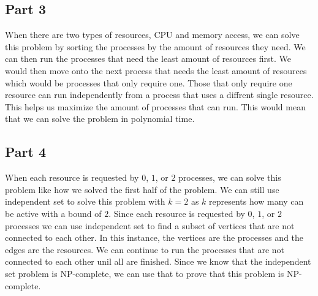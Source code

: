 \documentclass[12pt,letterpaper]{article}
\begin{document}
\subsection{Part 3}

When there are two types of resources, CPU and memory access, we can solve this problem by sorting the processes by the amount of resources they need. We can then run the processes that need the least amount of resources first. We would then move onto the next process that needs the least amount of resources which would be processes that only require one. Those that only require one resource can run independently from a process that uses a diffrent single resource. This helps us maximize the amount of processes that can run. This would mean that we can solve the problem in polynomial time.

\subsection{Part 4}

When each resource is requested by $0$, $1$, or $2$ processes, we can solve this problem like how we solved the first half of the problem. We can still use independent set to solve this problem with $k = 2$ as $k$ represents how many can be active with a bound of $2$. Since each resource is requested by  $0$, $1$, or $2$ processes we can use independent set to find a subset of vertices that are not connected to each other. In this instance, the vertices are the processes and the edges are the resources. We can continue to run the processes that are not connected to each other unil all are finished. Since we know that the independent set problem is NP-complete, we can use that to prove that this problem is NP-complete.
\end{document}
